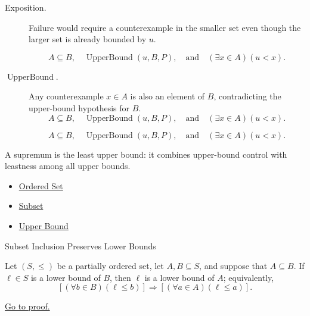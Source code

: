 \begin{remark*}
\begin{description}
  \item[Exposition.]
  Failure would require a counterexample in the smaller set even though
  the larger set is already bounded by $u$.

  
\[
A\subseteq B,\quad \operatorname{UpperBound}(u,B,P),
  \quad\text{and}\quad
  (\exists x\in A)(u<x).
\]
  \item[\(\operatorname{UpperBound}.\)]
  Any counterexample $x\in A$ is also an element of $B$, contradicting the
  upper-bound hypothesis for $B$.
  \[
    A\subseteq B,\quad \operatorname{UpperBound}(u,B,P),
    \quad\text{and}\quad
    (\exists x\in A)(u<x).
  \]

\[
    A\subseteq B,\quad \operatorname{UpperBound}(u,B,P),
    \quad\text{and}\quad
    (\exists x\in A)(u<x).
  \]
\end{description}
\end{remark*}

\begin{remark*}[Interpretation]
A supremum is the least upper bound: it combines upper-bound control with leastness among all upper bounds.
\end{remark*}

\begin{dependencies}
\begin{itemize}
  \item \hyperref[def:ordered-set]{Ordered Set}
  \item \hyperref[def:subset]{Subset}
  \item \hyperref[def:real-upper-bound]{Upper Bound}
\end{itemize}
\end{dependencies}

\begin{lemmabox}{Subset Inclusion Preserves Lower Bounds}
\begin{lemma}
\label{lem:subset-inclusion-preserves-lower-bounds}
Let $(S,\leq)$ be a partially ordered set, let $A,B\subseteq S$, and suppose
that $A\subseteq B$. If $\ell\in S$ is a lower bound of $B$, then $\ell$ is
a lower bound of $A$; equivalently,
\[
  \left[(\forall b\in B)(\ell\leq b)\right]
  \Longrightarrow
  \left[(\forall a\in A)(\ell\leq a)\right].
\]

\hyperref[prf:subset-inclusion-preserves-lower-bounds]{Go to proof.}
\end{lemma}
\end{lemmabox}

